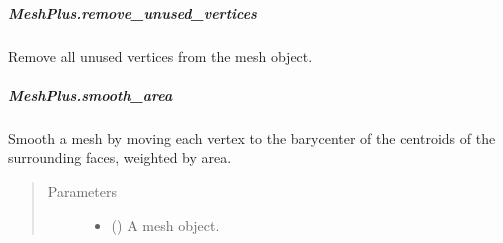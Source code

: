 \documentclass[letterpaper,10pt,english]{sphinxmanual}
\begin{document}
\begin{fulllineitems}
\subparagraph{MeshPlus.remove\_unused\_vertices}
\label{\detokenize{api/generated/directional_clustering.mesh.MeshPlus.remove_unused_vertices:meshplus-remove-unused-vertices}}\label{\detokenize{api/generated/directional_clustering.mesh.MeshPlus.remove_unused_vertices::doc}}

\begin{fulllineitems}
\label{\detokenize{api/generated/directional_clustering.mesh.MeshPlus.remove_unused_vertices:directional_clustering.mesh.MeshPlus.remove_unused_vertices}}
Remove all unused vertices from the mesh object.

\end{fulllineitems}



\subparagraph{MeshPlus.smooth\_area}
\label{\detokenize{api/generated/directional_clustering.mesh.MeshPlus.smooth_area:meshplus-smooth-area}}\label{\detokenize{api/generated/directional_clustering.mesh.MeshPlus.smooth_area::doc}}

\begin{fulllineitems}
\label{\detokenize{api/generated/directional_clustering.mesh.MeshPlus.smooth_area:directional_clustering.mesh.MeshPlus.smooth_area}}
Smooth a mesh by moving each vertex to the barycenter of the centroids of the surrounding faces, weighted by area.
\begin{quote}\begin{description}
\item[{Parameters}] \leavevmode\begin{itemize}
\item {} 
 () \textendash{} A mesh object.


\end{itemize}
\end{description}
\end{quote}
\end{fulllineitems}
\end{fulllineitems}
\end{document}
